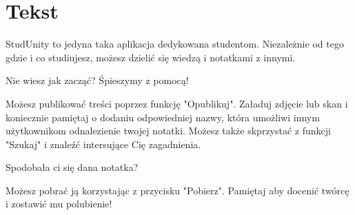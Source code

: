 \section{Tekst}

\noindent StudUnity to jedyna taka aplikacja dedykowana studentom. Niezależnie od tego gdzie i co studiujesz, możesz dzielić się wiedzą i notatkami z innymi.


\maketitle Nie wiesz jak zacząć? Śpieszymy z pomocą!


\noindent 
Możesz publikować treści poprzez funkcję "Opublikuj".
Załaduj zdjęcie lub skan i koniecznie pamiętaj o dodaniu odpowiedniej nazwy, która umożliwi innym użytkownikom odnalezienie twojej notatki. 
Możesz także skprzystać z funkcji "Szukaj" i znaleźć intersujące Cię zagadnienia.

\maketitle Spodobała ci się dana notatka?


\noindent Możesz pobrać ją korzystając z przycisku "Pobierz".
Pamiętaj aby docenić twórcę i zostawić mu polubienie!



